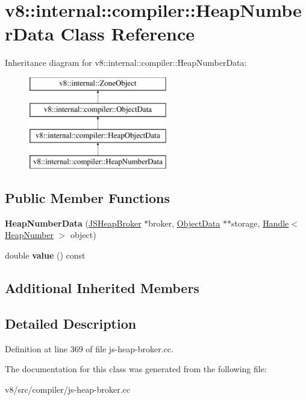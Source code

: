 \hypertarget{classv8_1_1internal_1_1compiler_1_1HeapNumberData}{}\section{v8\+:\+:internal\+:\+:compiler\+:\+:Heap\+Number\+Data Class Reference}
\label{classv8_1_1internal_1_1compiler_1_1HeapNumberData}
Inheritance diagram for v8\+:\+:internal\+:\+:compiler\+:\+:Heap\+Number\+Data\+:\begin{figure}[H]
\begin{center}
\leavevmode
\includegraphics[height=4.000000cm]{classv8_1_1internal_1_1compiler_1_1HeapNumberData}
\end{center}
\end{figure}
\subsection*{Public Member Functions}
\begin{DoxyCompactItemize}
\item 
\mbox{\label{classv8_1_1internal_1_1compiler_1_1HeapNumberData_ae9d7595a806e0a767a4665be04760a24}} 
{\bfseries Heap\+Number\+Data} (\mbox{\hyperlink{classv8_1_1internal_1_1compiler_1_1JSHeapBroker}{J\+S\+Heap\+Broker}} $\ast$broker, \mbox{\hyperlink{classv8_1_1internal_1_1compiler_1_1ObjectData}{Object\+Data}} $\ast$$\ast$storage, \mbox{\hyperlink{classv8_1_1internal_1_1Handle}{Handle}}$<$ \mbox{\hyperlink{classv8_1_1internal_1_1HeapNumber}{Heap\+Number}} $>$ object)
\item 
\mbox{\label{classv8_1_1internal_1_1compiler_1_1HeapNumberData_a61521ffcfd1c128ed0d77de97dd0b46c}} 
double {\bfseries value} () const
\end{DoxyCompactItemize}
\subsection*{Additional Inherited Members}


\subsection{Detailed Description}


Definition at line 369 of file js-\/heap-\/broker.\+cc.



The documentation for this class was generated from the following file\+:\begin{DoxyCompactItemize}
\item 
v8/src/compiler/js-\/heap-\/broker.\+cc\end{DoxyCompactItemize}
